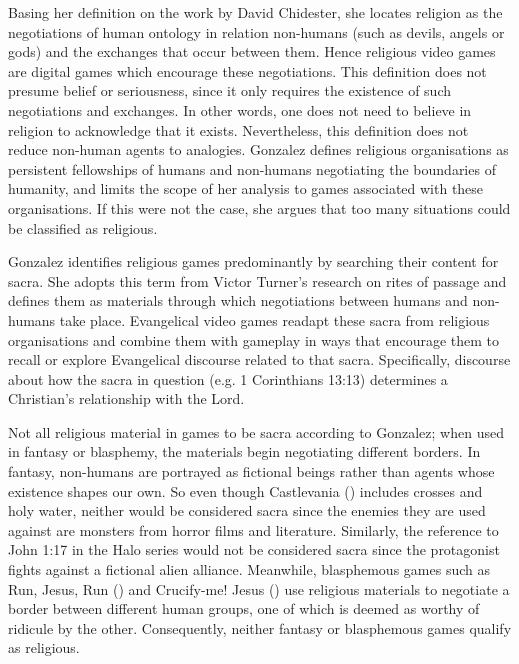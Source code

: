 Basing her definition on the work by David Chidester, she locates religion as the negotiations of human ontology in relation non-humans (such as devils, angels or gods) and the exchanges that occur between them. Hence religious video games are digital games which encourage these negotiations. This definition does not presume belief or seriousness, since it only requires the existence of such negotiations and exchanges. In other words, one does not need to believe in religion to acknowledge that it exists. Nevertheless, this definition does not reduce non-human agents to analogies. Gonzalez defines religious organisations as persistent fellowships of humans and non-humans negotiating the boundaries of humanity, and limits the scope of her analysis to games associated with these organisations. If this were not the case, she argues that too many situations could be classified as religious.
 
Gonzalez identifies religious games predominantly by searching their content for sacra. She adopts this term from Victor Turner’s research on rites of passage and defines them as materials through which negotiations between humans and non-humans take place. Evangelical video games readapt these sacra from religious organisations and combine them with gameplay in ways that encourage them to recall or explore Evangelical discourse related to that sacra. Specifically, discourse about how the sacra in question (e.g. 1 Corinthians 13:13) determines a Christian’s relationship with the Lord.


Not all religious material in games to be sacra according to Gonzalez; when used in fantasy or blasphemy, the materials begin negotiating different borders. In fantasy, non-humans are portrayed as fictional beings rather than agents whose existence shapes our own. So even though Castlevania () includes crosses and holy water, neither would be considered sacra since the enemies they are used against are monsters from horror films and literature. Similarly, the reference to John 1:17 in the Halo series would not be considered sacra since the protagonist fights against a fictional alien alliance. Meanwhile, blasphemous games such as Run, Jesus, Run () and Crucify-me! Jesus () use religious materials to negotiate a border between different human groups, one of which is deemed as worthy of ridicule by the other. Consequently, neither fantasy or blasphemous games qualify as religious.

